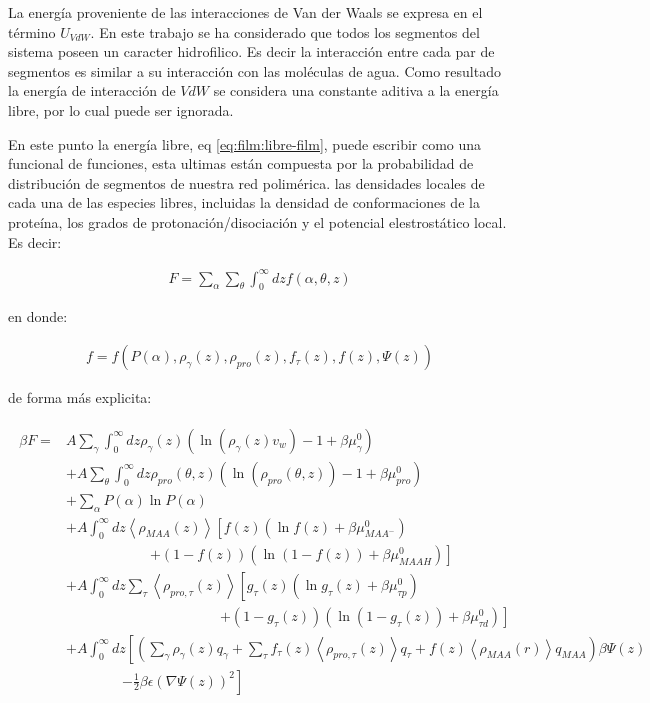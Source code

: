 La energ\'ia proveniente de las interacciones de Van der Waals se expresa en el t\'ermino $U_{VdW}$. En este trabajo se ha considerado que todos los segmentos del sistema poseen un caracter hidrofilico. Es decir la interacci\'on entre cada par de segmentos es similar a su interacci\'on con las mol\'eculas de agua. Como resultado la energ\'ia de interacci\'on de $VdW$ se considera una constante aditiva a la energ\'ia libre, por lo cual puede ser ignorada.

En este punto la energ\'ia libre, eq \ref{eq:film:libre-film}, puede escribir como una funcional de funciones, esta ultimas est\'an compuesta por la probabilidad de distribuci\'on de segmentos de nuestra red polim\'erica. las densidades locales de cada una de las especies libres, incluidas la densidad de conformaciones de la prote\'ina, los grados de protonaci\'on/disociaci\'on y el potencial elestrost\'atico local. Es decir:

\begin{align}
	F = \sum_\alpha \sum_\theta \int_0^\infty dz f(\alpha, \theta,z)
\end{align}

\noindent en donde:

\begin{align}
	 f=  f \left( P(\alpha), \rho_\gamma(z),\rho_{pro}(z), f_\tau(z), f(z), \Psi(z)  \right)
	 \label{eq:film:funcionales}
 \end{align}

de forma m\'as explicita:

\begin{align}
	\begin{aligned}
		\beta F=  & A\sum_{\gamma}\int_0^\infty{dz\rho_\gamma(z)\left(\ln \left(\rho_\gamma (z)v_w\right) -1 + \beta\mu^0_\gamma\right)} \\
		&+ A\sum_{\theta}\int_0^\infty{dz\rho_{pro}(\theta,z)\left(\ln \left(\rho_{pro}(\theta,z)\right) -1 + \beta\mu^0_{pro} \right)} \\
		&+ \sum_\alpha{P(\alpha)\ln P(\alpha)} \\
		& + A\int_0^\infty dz \left<\rho_{MAA}(z)\right> \left[f(z)(\ln f(z)+ \beta\mu^0_{MAA^-})\right.\\
		& \qquad\qquad\qquad \left.+(1-f(z))(\ln (1-f(z))+\beta\mu^0_{MAAH})\right] \\
		& + A\int_0^\infty dz \sum_\tau \left<\rho_{pro,\tau}(z)\right> \left[g_\tau(z)(\ln g_\tau(z)+ \beta\mu^0_{\tau p})\right.\\
		&\qquad \qquad \qquad\qquad \qquad\quad \left.+(1-g_\tau(z))(\ln (1-g_\tau(z))+\beta\mu^0_{\tau d})\right]   \\
		 & +A\int_0^\infty dz \left[\left(\sum_{\gamma } {\rho_\gamma(z) q_\gamma + \sum_\tau{f_\tau(z) \left<\rho_{pro,\tau}(z)\right> q_\tau} +  f(z)\left<\rho_{MAA}(r)\right>q_{MAA}}\right)\beta\Psi(z) \right. \\ & \qquad \qquad \left.-\frac{1}{2}\beta\epsilon(\nabla\Psi(z))^2 \right]
		\end{aligned}
\end{align}


